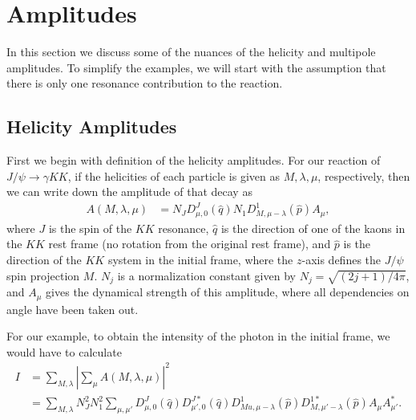 \documentclass[11pt]{article}
\begin{document}
\section{Amplitudes}
In this section we discuss some of the nuances of the helicity and
multipole amplitudes. To simplify the examples, we will start with the
assumption that there is only one resonance contribution to the
reaction.

\subsection{Helicity Amplitudes}

First we begin with definition of the helicity amplitudes. For our
reaction of $J/\psi \to \gamma KK$, if the helicities of each particle
is given as $M, \lambda, \mu$, respectively, then we can write down
the amplitude of that decay as
\begin{align}
  A(M,\lambda,\mu) &= N_{J} D^{J}_{\mu,0}(\hat{q}) N_{1}
  D^{1}_{M,\mu-\lambda}(\hat{p}) A_{\mu},
\end{align}
where $J$ is the spin of the $KK$ resonance, $\hat{q}$ is the
direction of one of the kaons in the $KK$ rest frame (no rotation from
the original rest frame), and $\hat{p}$ is the direction of the $KK$
system in the initial frame, where the $z$-axis defines the $J/\psi$
spin projection $M$. $N_{j}$ is a normalization constant given by
$N_{j} = \sqrt{(2j+1)/4\pi}$, and $A_{\mu}$ gives the dynamical
strength of this amplitude, where all dependencies on angle have been
taken out.

For our example, to obtain the intensity of the photon in the initial
frame, we would have to calculate
\begin{align}
  I &= \sum_{M, \lambda} \left| \sum_{\mu} A(M, \lambda, \mu)
  \right|^{2} \\
  &= \sum_{M, \lambda} N_{J}^{2} N_{1}^{2} \sum_{\mu, \mu'}
  D^{J}_{\mu,0} (\hat{q}) D^{J \ast}_{\mu',0} (\hat{q})
  D^{1}_{Mu,\mu-\lambda} (\hat{p}) D^{1 \ast}_{M,\mu'-\lambda}
  (\hat{p}) A_{\mu} A_{\mu'}^{\ast}.
\end{align}
\end{document}
